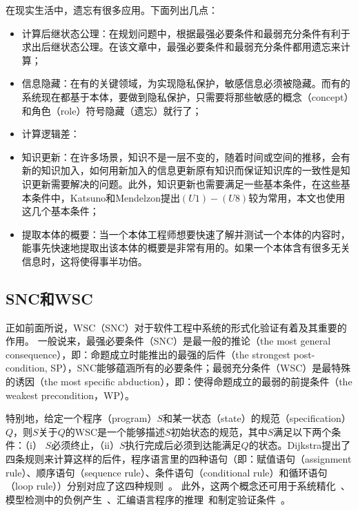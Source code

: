 在现实生活中，遗忘有很多应用。下面列出几点：
\begin{itemize}
	\item 计算后继状态公理：在规划问题中，根据最强必要条件和最弱充分条件有利于求出后继状态公理\cite{DBLP:journals/jair/Lin03}。在该文章中，最强必要条件和最弱充分条件都用遗忘来计算；
	\item 信息隐藏：在有的关键领域，为实现隐私保护，敏感信息必须被隐藏。而有的系统现在都基于本体，要做到隐私保护，只需要将那些敏感的概念（concept）和角色（role）符号隐藏（遗忘）就行了；
	\item 计算逻辑差：
	\item 知识更新：在许多场景，知识不是一层不变的，随着时间或空间的推移，会有新的知识加入，如何用新加入的信息更新原有知识而保证知识库的一致性是知识更新需要解决的问题。此外，知识更新也需要满足一些基本条件，在这些基本条件中，Katsuno和Mendelzon提出$(U1)-(U8)$较为常用，本文也使用这几个基本条件；
	\item 提取本体的概要：当一个本体工程师想要快速了解并测试一个本体的内容时，能事先快速地提取出该本体的概要是非常有用的。如果一个本体含有很多无关信息时，这将使得事半功倍。
\end{itemize}







\subsection{SNC和WSC}


正如前面所说，WSC（SNC）对于软件工程中系统的形式化验证有着及其重要的作用。
一般说来，最强必要条件（SNC）是最一般的推论（the most general consequence），即：命题成立时能推出的最强的后件（the strongest post-condition, SP），SNC能够蕴涵所有的必要条件；最弱充分条件（WSC）是最特殊的诱因（the most specific abduction），即：使得命题成立的最弱的前提条件（the weakest precondition，WP）。

特别地，给定一个程序（program）$S$和某一状态（state）的规范（specification）$Q$，则$S$关于$Q$的WSC是一个能够描述$S$初始状态的规范，其中$S$满足以下两个条件：（i） $S$必须终止，（ii）$S$执行完成后必须到达能满足$Q$的状态。Dijkstra提出了四条规则来计算这样的后件，程序语言里的四种语句（即：赋值语句（assignment rule）、顺序语句（sequence rule）、条件语句（conditional rule）和循环语句（loop rule））分别对应了这四种规则~\cite{DBLP:journals/cacm/Dijkstra75}。
此外，这两个概念还可用于系统精化~\cite{woodcock1990refinement}、模型检测中的负例产生~\cite{dailler2018instrumenting}、汇编语言程序的推理~\cite{legato2002weakest}和制定验证条件~\cite{DBLP:journals/ipl/Leino05}。


